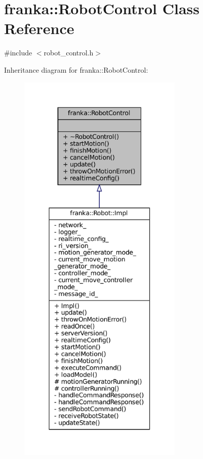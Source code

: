 \hypertarget{classfranka_1_1RobotControl}{}\section{franka\+:\+:Robot\+Control Class Reference}
\label{classfranka_1_1RobotControl}


{\ttfamily \#include $<$robot\+\_\+control.\+h$>$}



Inheritance diagram for franka\+:\+:Robot\+Control\+:
\nopagebreak
\begin{figure}[H]
\begin{center}
\leavevmode
\includegraphics[height=550pt]{classfranka_1_1RobotControl__inherit__graph}
\end{center}
\end{figure}


